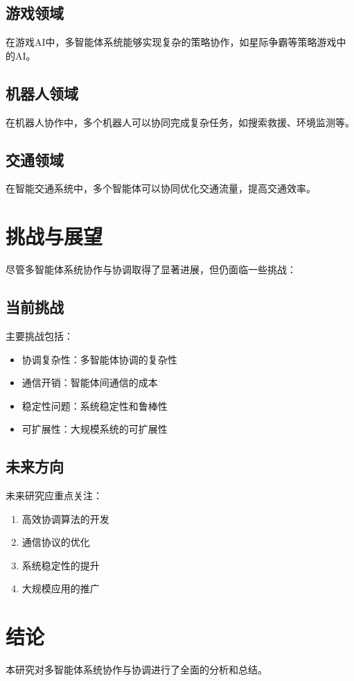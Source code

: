 \documentclass[12pt]{article}
\begin{document}
\subsection{游戏领域}
在游戏AI中，多智能体系统能够实现复杂的策略协作，如星际争霸等策略游戏中的AI。

\subsection{机器人领域}
在机器人协作中，多个机器人可以协同完成复杂任务，如搜索救援、环境监测等。

\subsection{交通领域}
在智能交通系统中，多个智能体可以协同优化交通流量，提高交通效率。

\section{挑战与展望}
尽管多智能体系统协作与协调取得了显著进展，但仍面临一些挑战：

\subsection{当前挑战}
主要挑战包括：
\begin{itemize}
    \item 协调复杂性：多智能体协调的复杂性
    \item 通信开销：智能体间通信的成本
    \item 稳定性问题：系统稳定性和鲁棒性
    \item 可扩展性：大规模系统的可扩展性
\end{itemize}

\subsection{未来方向}
未来研究应重点关注：
\begin{enumerate}
    \item 高效协调算法的开发
    \item 通信协议的优化
    \item 系统稳定性的提升
    \item 大规模应用的推广
\end{enumerate}

\section{结论}
本研究对多智能体系统协作与协调进行了全面的分析和总结。
\end{document}
